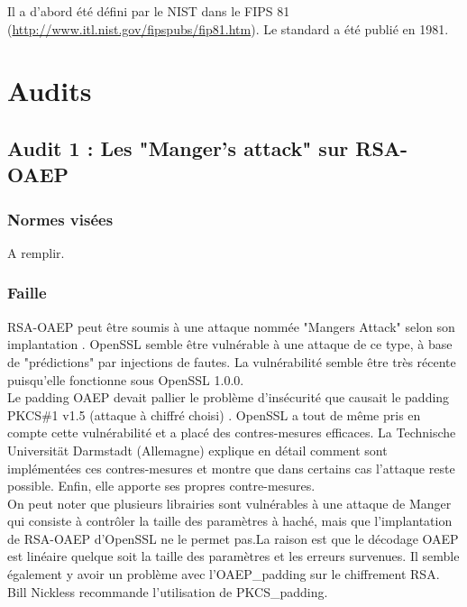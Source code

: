 Il a d'abord été défini par le NIST dans le FIPS 81 (\url{http://www.itl.nist.gov/fipspubs/fip81.htm}). Le standard a été publié en 1981.


\section{Audits}
	\subsection{Audit 1 : Les "Manger's attack" sur RSA-OAEP}
		\subsubsection{Normes visées}

		A remplir.
	
		\subsubsection{Faille}
		
			RSA-OAEP peut être soumis à une attaque nommée "Mangers Attack" selon son implantation \cite{mangers2010falko}. OpenSSL semble être vulnérable à une attaque de ce type, à base de "prédictions" par injections de fautes. La vulnérabilité semble être très récente puisqu'elle fonctionne sous OpenSSL 1.0.0.\\

			
			Le padding OAEP devait pallier le problème d'insécurité que causait le padding PKCS\#1 v1.5 (attaque à chiffré choisi) \cite{bleichenbacherPCKS}. OpenSSL a tout de même pris en compte cette vulnérabilité et a placé des contres-mesures efficaces.	La Technische Universität Darmstadt (Allemagne) explique en détail comment sont implémentées ces contres-mesures et montre que dans certains cas l'attaque reste possible. Enfin, elle apporte ses propres contre-mesures.\\
			
			On peut noter que plusieurs librairies sont vulnérables à une attaque de Manger qui consiste à contrôler la taille des paramètres à haché, mais que l'implantation de RSA-OAEP d'OpenSSL ne le permet pas.La raison est que le décodage OAEP est linéaire quelque soit la taille des paramètres et les erreurs survenues. 	Il semble également y avoir un problème avec l'OAEP\_padding sur le chiffrement RSA. Bill Nickless recommande l'utilisation de PKCS\_padding. \cite{sourceforgeRSAbroken}	\\
		
